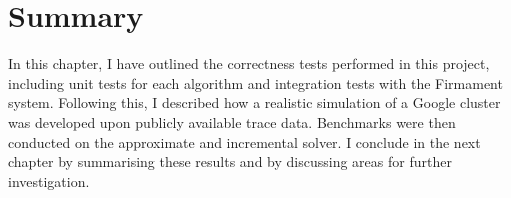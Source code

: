 \section{Summary}

In this chapter, I have outlined the correctness tests performed in this project, including unit tests for each algorithm and integration tests with the Firmament system. Following this, I described how a realistic simulation of a Google cluster was developed upon publicly available trace data. Benchmarks were then conducted on the approximate and incremental solver. I conclude in the next chapter by summarising these results and by discussing areas for further investigation.